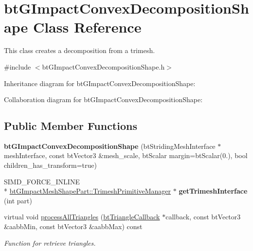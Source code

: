 \hypertarget{classbt_g_impact_convex_decomposition_shape}{\section{bt\+G\+Impact\+Convex\+Decomposition\+Shape Class Reference}
\label{classbt_g_impact_convex_decomposition_shape}
}


This class creates a decomposition from a trimesh.  




{\ttfamily \#include $<$bt\+G\+Impact\+Convex\+Decomposition\+Shape.\+h$>$}



Inheritance diagram for bt\+G\+Impact\+Convex\+Decomposition\+Shape\+:


Collaboration diagram for bt\+G\+Impact\+Convex\+Decomposition\+Shape\+:
\subsection*{Public Member Functions}
\begin{DoxyCompactItemize}
\item 
\hypertarget{classbt_g_impact_convex_decomposition_shape_a5b2982fbc300b02d3af40b5acfe1e895}{{\bfseries bt\+G\+Impact\+Convex\+Decomposition\+Shape} (bt\+Striding\+Mesh\+Interface $\ast$mesh\+Interface, const bt\+Vector3 \&mesh\+\_\+scale, bt\+Scalar margin=bt\+Scalar(0.), bool children\+\_\+has\+\_\+transform=true)}\label{classbt_g_impact_convex_decomposition_shape_a5b2982fbc300b02d3af40b5acfe1e895}

\item 
\hypertarget{classbt_g_impact_convex_decomposition_shape_a773cc6848419f8647278e8595ebfb5dc}{S\+I\+M\+D\+\_\+\+F\+O\+R\+C\+E\+\_\+\+I\+N\+L\+I\+N\+E \\*
\hyperlink{classbt_g_impact_mesh_shape_part_1_1_trimesh_primitive_manager}{bt\+G\+Impact\+Mesh\+Shape\+Part\+::\+Trimesh\+Primitive\+Manager} $\ast$ {\bfseries get\+Trimesh\+Interface} (int part)}\label{classbt_g_impact_convex_decomposition_shape_a773cc6848419f8647278e8595ebfb5dc}

\item 
virtual void \hyperlink{classbt_g_impact_convex_decomposition_shape_aa59df7c7624fef1874c5874f0207f561}{process\+All\+Triangles} (\hyperlink{classbt_triangle_callback}{bt\+Triangle\+Callback} $\ast$callback, const bt\+Vector3 \&aabb\+Min, const bt\+Vector3 \&aabb\+Max) const 
\begin{DoxyCompactList}\small\item\em Function for retrieve triangles. \end{DoxyCompactList}\end{DoxyCompactItemize}
